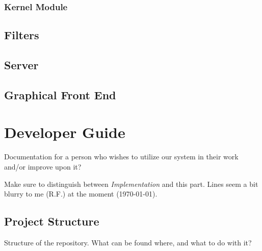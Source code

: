 \documentclass[a4paper,oneside]{alpenthesis/alpenthesis}
\begin{document}
\section{Kernel Module}

\chapter{Filters} %
\label{ch:filters}


\chapter{Server} %
\label{ch:server}


\chapter{Graphical Front End} %
\label{ch:graphical_front_end}





\part{Developer Guide} %
\label{part:Developer_Guide}
Documentation for a person who wishes to utilize our system in their work and/or
improve upon it?

Make sure  to distinguish  between \emph{Implementation} and  this part. Lines
seem a bit blurry to me (R.F.) at the moment (\today).

\chapter{Project Structure} %
\label{ch:Project_Structure}
Structure of the repository. What can be found where, and what to do with it?
\end{document}
